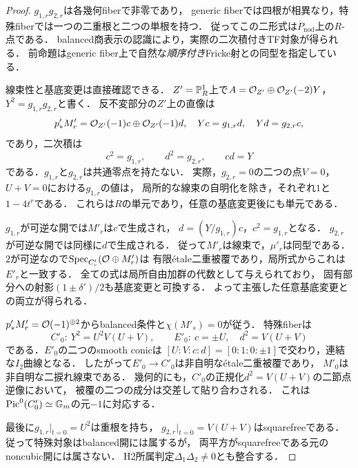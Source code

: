 \begin{proof}
$g_{1,r}g_{2,r}$は各幾何fiberで非零であり，
generic fiberでは四根が相異なり，特殊fiberでは一つの二重根と二つの単根を持つ．
従ってこの二形式は$\overline P_{\mathrm{nod}}$上の$R$-点である．
balanced商表示の認識により，実際の二次積付きTF対象が得られる．
前命題はgeneric fiber上で自然な\emph{順序付き}Fricke射との同型を指定している．

線束性と基底変更は直接確認できる．
$Z'=\mathbb P^1_R$上で$A=\mathcal O_{Z'}\oplus\mathcal O_{Z'}(-2)Y$，$Y^2=g_{1,r}g_{2,r}$と書く．
反不変部分の$Z'$上の直像は
\[
 p'_*M'_r=\mathcal O_{Z'}(-1)c\oplus\mathcal O_{Z'}(-1)d,
 \quad Yc=g_{1,r}d,\quad Yd=g_{2,r}c,
\]
であり，二次積は
\[
 c^2=g_{1,r},\qquad d^2=g_{2,r},\qquad cd=Y
\]
である．$g_{1,r}$と$g_{2,r}$は共通零点を持たない．
実際，$g_{2,r}=0$の二つの点$V=0$，$U+V=0$における$g_{1,r}$の値は，
局所的な線束の自明化を除き，それぞれ$1$と$1-4t^r$である．
これらは$R$の単元であり，任意の基底変更後にも単元である．

$g_{1,r}$が可逆な開では$M'_r$は$c$で生成され，
$d=(Y/g_{1,r})c$，$c^2=g_{1,r}$となる．
$g_{2,r}$が可逆な開では同様に$d$で生成される．
従って$M'_r$は線束で，$\mu'_r$は同型である．
$2$が可逆なので$\operatorname{Spec}_{C'_r}(\mathcal O\oplus M'_r)$は
有限\'etale二重被覆であり，局所式からこれは$E'_r$と一致する．
全ての式は局所自由加群の代数として与えられており，
固有部分への射影$(1\pm\delta')/2$も基底変更と可換する．
よって主張した任意基底変更との両立が得られる．

$p'_*M'_r=\mathcal O(-1)^{\oplus2}$からbalanced条件と$\chi(M'_s)=0$が従う．
特殊fiberは
\[
 C'_0:\ Y^2=U^2V(U+V),\qquad
 E'_0:\ c=\pm U,\quad d^2=V(U+V)
\]
である．$E'_0$の二つのsmooth conicは
$[U:V:c:d]=[0:1:0:\pm1]$で交わり，連結な$I_2$曲線となる．
したがって$E'_0\to C'_0$は非自明な\'etale二重被覆であり，
$M'_0$は非自明な二捩れ線束である．
幾何的にも，$C'_0$の正規化$d^2=V(U+V)$の二節点逆像において，
被覆の二つの成分は交差して貼り合わされる．
これは$\operatorname{Pic}^0(C'_0)\simeq\mathbb G_m$の元$-1$に対応する．

最後に$g_{1,r}|_{t=0}=U^2$は重根を持ち，
$g_{2,r}|_{t=0}=V(U+V)$はsquarefreeである．
従って特殊対象はbalanced開には属するが，
両平方がsquarefreeである元のnoncubic開には属さない．
H2所属判定$\Delta_1\Delta_2\ne0$とも整合する．
\end{proof}

